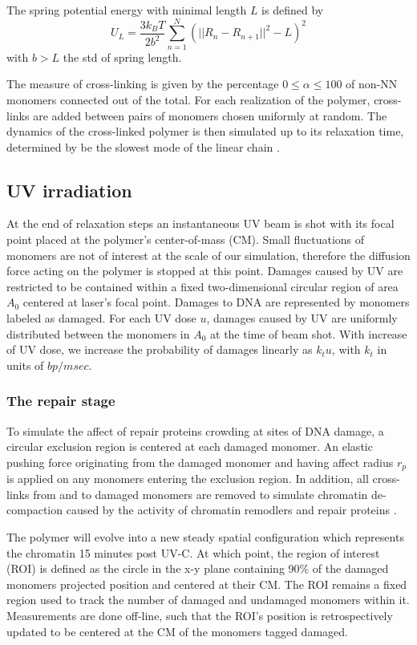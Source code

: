 \documentclass[12pt]{article}
\begin{document}
	The spring potential energy with minimal length $L$ is defined by  
	\begin{equation}
	U_L=\frac{3k_BT}{2b^2}\sum_{n=1}^N (||R_{n}-R_{n+1}||^2-L)^2
	\end{equation}
    with $b>L$ the std of spring length. 
    	
	The measure of cross-linking is given by the percentage $0\leq \alpha\leq 100$ of non-NN monomers connected out of the total. For each realization of the polymer, cross-links are added between pairs of monomers chosen uniformly at random. The dynamics of the cross-linked polymer is then simulated up to its relaxation time, determined by be the slowest mode of the linear chain \cite{doi1988theory}.

	\subsection{UV irradiation}
	At the end of relaxation steps an instantaneous UV beam is shot with its focal point placed at the polymer's center-of-mass (CM). Small fluctuations of monomers are not of interest at the scale of our simulation, therefore the diffusion force acting on the polymer is stopped at this point. Damages caused by UV are restricted to be contained within a fixed two-dimensional circular region of area $A_0$ centered at laser's focal point. Damages to DNA are represented by monomers labeled as damaged. For each UV dose $u$, damages caused by UV are uniformly distributed between the monomers in $A_0$ at the time of beam shot. With increase of UV dose, we increase the probability of damages linearly as $k_tu$, with $k_t$ in units of $bp/msec$. 
	
	\subsubsection{The repair stage}	
	To simulate the affect of repair proteins crowding at sites of DNA damage, a circular exclusion region is centered at each damaged monomer. An elastic pushing force originating from the damaged monomer and having affect radius $r_p$ is applied on any monomers entering the exclusion region. In addition, all cross-links from and to damaged monomers are removed to simulate chromatin de-compaction caused by the activity of chromatin remodlers and repair proteins \cite{gaillard2003chromatin}. 
	
	The polymer will evolve into a new steady spatial configuration which represents the chromatin 15 minutes post UV-C. At which point, the region of interest (ROI) is defined as the circle in the x-y plane containing 90\% of the damaged monomers projected position and centered at their CM. The ROI remains a fixed region used to track the number of damaged and undamaged monomers within it. Measurements are done off-line, such that the ROI's position is retrospectively updated to be centered at the CM of the monomers tagged damaged.
	
\end{document}
